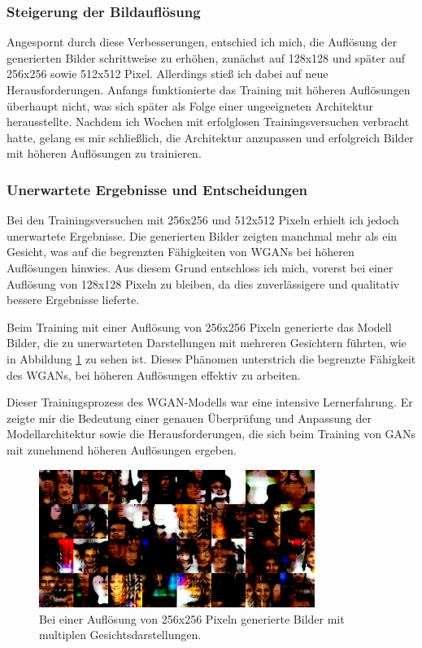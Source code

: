 \documentclass[a4paper, 12pt]{article}
\begin{document}
\subsubsection{Steigerung der Bildauflösung}
Angespornt durch diese Verbesserungen, entschied ich mich, die Auflösung der generierten Bilder schrittweise zu erhöhen, zunächst auf 128x128 und später auf 256x256 sowie 512x512 Pixel. Allerdings stieß ich dabei auf neue Herausforderungen. Anfangs funktionierte das Training mit höheren Auflösungen überhaupt nicht, was sich später als Folge einer ungeeigneten Architektur herausstellte. Nachdem ich Wochen mit erfolglosen Trainingsversuchen verbracht hatte, gelang es mir schließlich, die Architektur anzupassen und erfolgreich Bilder mit höheren Auflösungen zu trainieren.

\subsubsection{Unerwartete Ergebnisse und Entscheidungen}
Bei den Trainingsversuchen mit 256x256 und 512x512 Pixeln erhielt ich jedoch unerwartete Ergebnisse. Die generierten Bilder zeigten manchmal mehr als ein Gesicht, was auf die begrenzten Fähigkeiten von WGANs bei höheren Auflösungen hinwies. Aus diesem Grund entschloss ich mich, vorerst bei einer Auflösung von 128x128 Pixeln zu bleiben, da dies zuverlässigere und qualitativ bessere Ergebnisse lieferte.


Beim Training mit einer Auflösung von 256x256 Pixeln generierte das Modell Bilder, die zu unerwarteten Darstellungen mit mehreren Gesichtern führten, wie in Abbildung \ref{fig:multiple_faces} zu sehen ist. Dieses Phänomen unterstrich die begrenzte Fähigkeit des WGANs, bei höheren Auflösungen effektiv zu arbeiten.

Dieser Trainingsprozess des WGAN-Modells war eine intensive Lernerfahrung. Er zeigte mir die Bedeutung einer genauen Überprüfung und Anpassung der Modellarchitektur sowie die Herausforderungen, die sich beim Training von GANs mit zunehmend höheren Auflösungen ergeben.

\begin{figure}[ht]
\centering
\includegraphics[width=0.8\textwidth]{./img/256x256.png}
\caption{Bei einer Auflösung von 256x256 Pixeln generierte Bilder mit multiplen Gesichtsdarstellungen.}
\label{fig:multiple_faces}
\end{figure}
\end{document}
